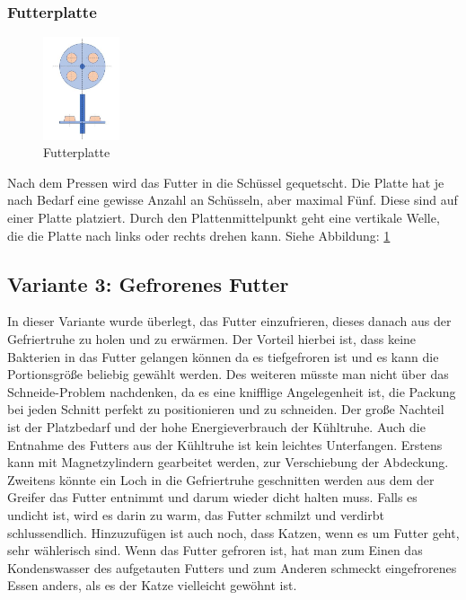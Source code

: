 \subsubsection{Futterplatte}

\begin{figure}
\vspace{-45pt}
  \begin{center}
    \includegraphics[width=0.20\textwidth]{Bilder/Powerpoint/Futterplatte}
  \end{center}
  \caption{Futterplatte}
  \label{Futterplatte}
  \vspace{-35pt}
\end{figure}


Nach dem Pressen wird das Futter in die Schüssel gequetscht. Die Platte hat je nach Bedarf eine gewisse Anzahl an Schüsseln, aber maximal Fünf. Diese sind auf einer Platte platziert. Durch den Plattenmittelpunkt geht eine vertikale Welle, die die Platte nach links oder rechts drehen kann. Siehe Abbildung: \ref{Futterplatte} \\


\subsection{Variante 3: Gefrorenes Futter}

In dieser Variante wurde überlegt, das Futter einzufrieren, dieses danach aus der Gefriertruhe zu holen und zu erwärmen. Der Vorteil hierbei ist, dass keine Bakterien in das Futter gelangen können da es tiefgefroren ist und es kann die Portionsgröße beliebig gewählt werden. Des weiteren müsste man nicht über das Schneide-Problem nachdenken, da es eine knifflige Angelegenheit ist, die Packung bei jeden Schnitt perfekt zu positionieren und zu schneiden. Der große Nachteil ist der Platzbedarf und der hohe Energieverbrauch der Kühltruhe. Auch die Entnahme des Futters aus der Kühltruhe ist kein leichtes Unterfangen. Erstens kann mit Magnetzylindern gearbeitet werden, zur Verschiebung der Abdeckung. Zweitens könnte ein Loch in die Gefriertruhe geschnitten werden aus dem der Greifer das Futter entnimmt und darum wieder dicht halten muss. Falls es undicht ist, wird es darin zu warm, das Futter schmilzt und verdirbt schlussendlich. Hinzuzufügen ist auch noch, dass Katzen, wenn es um Futter geht, sehr wählerisch sind. Wenn das Futter gefroren ist, hat man zum Einen das Kondenswasser des aufgetauten Futters und zum Anderen schmeckt eingefrorenes Essen anders, als es der Katze vielleicht gewöhnt ist.


